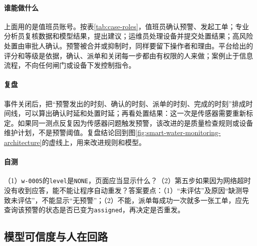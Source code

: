 \paragraph{谁能做什么}上面用的是值班员账号。按表\ref{tab:case-roles}，值班员确认预警、发起工单；专业分析员复核数据和模型结果，提出建议；运维员处理设备并提交处置结果；高风险处置由审批人确认。预警被合并或抑制时，同样要留下操作者和理由。平台给出的评分和等级是依据，确认、派单和关闭每一步都由有权限的人来做；案例止于信息流程，不向任何闸门或设备下发控制指令。

\paragraph{复盘}事件关闭后，把“预警发出的时刻、确认的时刻、派单的时刻、完成的时刻”排成时间线，可以算出确认时延和处置时延；再看处置结果：这一次是传感器需要重新标定。如果同一测点反复因为传感器问题触发预警，该改进的是质量检查规则或设备维护计划，不是预警阈值。复盘结论回到图\ref{fig:smart-water-monitoring-architecture}的虚线上，用来改进规则和模型。

\paragraph{自测}（1）\texttt{w-0005}的\texttt{level}是\texttt{NONE}，页面应当显示什么？（2）第五步如果因为网络超时没有收到应答，能不能让程序自动重发？答案要点：（1）“未评估”及原因“缺测导致未评估”，不能显示“无预警”；（2）不能，派单每成功一次就多一张工单，应先查询该预警的状态是否已变为\texttt{assigned}，再决定是否重发。

\subsection{模型可信度与人在回路}

